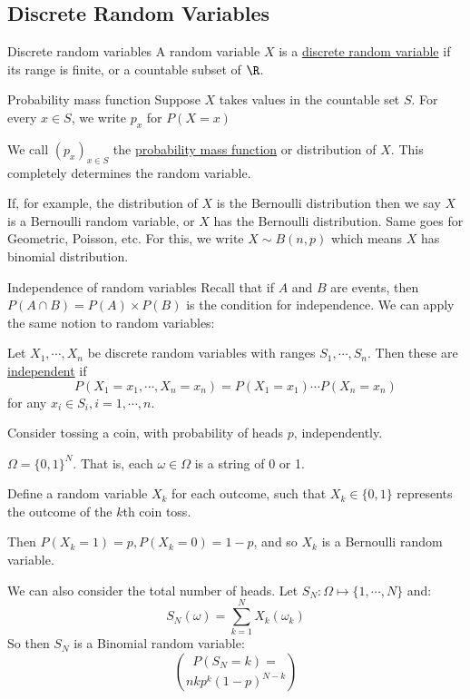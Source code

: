 \documentclass[../Main.tex]{subfiles}
\begin{document}
\subsection{Discrete Random Variables}
\begin{definition}{Discrete random variables}
    A random variable $X$ is a \underline{discrete random variable} if its range is finite, or a countable subset of $\R$.
\end{definition}
\begin{definition}{Probability mass function}
    Suppose $X$ takes values in the countable set $S$. For every $x \in S$, we write $p_x$ for $P(X = x)$\par
    We call $(p_x)_{x \in S}$ the \underline{probability mass function} or distribution of $X$. This completely determines the random variable.
\end{definition}
If, for example, the distribution of $X$ is the Bernoulli distribution then we say $X$ is a Bernoulli random variable, or $X$ has the Bernoulli distribution. Same goes for Geometric, Poisson, etc. For this, we write $X \sim B(n, p)$ which means $X$ has binomial distribution.
\begin{definition}{Independence of random variables}
    Recall that if $A$ and $B$ are events, then $P(A \cap B) = P(A) \times P(B)$ is the condition for independence. We can apply the same notion to random variables:\par
    Let $X_1, \cdots, X_n$ be discrete random variables with ranges $S_1, \cdots, S_n$. Then these are \underline{independent} if 
    \begin{equation*}
        P(X_1 = x_1, \cdots, X_n = x_n) = P(X_1 = x_1) \cdots P(X_n = x_n)
    \end{equation*}
    for any $x_i \in S_i, i = 1, \cdots, n$.
\end{definition}
\begin{example}
    Consider tossing a coin, with probability of heads $p$, independently.\par
    $\Omega = \{0, 1\}^N$. That is, each $\omega \in \Omega$ is a string of 0 or 1.\par
    Define a random variable $X_k$ for each outcome, such that $X_k \in \{0, 1\}$ represents the outcome of the $k$th coin toss.\par
    Then $P(X_k = 1) = p, P(X_k = 0) = 1-p$, and so $X_k$ is a Bernoulli random variable.\par
    We can also consider the total number of heads. Let $S_N : \Omega \mapsto \{1, \cdots, N\}$ and:
    \begin{equation*}
        S_N(\omega) = \sum_{k=1}^N X_k(\omega_k)
    \end{equation*}
    So then $S_N$ is a Binomial random variable:
    \begin{equation*}
        P(S_N = k) = \choose{n}{k} p^k (1-p)^{N-k}
    \end{equation*}
\end{example}
\end{document}
